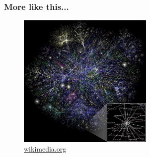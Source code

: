     \begin{frame}
    \frametitle{More like this...}
      \begin{figure}
    \includegraphics[height=6.5cm]{./imgs/map.jpg}
  \caption{\color{blue}\href{https://upload.wikimedia.org/wikipedia/commons/thumb/d/d2/Internet_map_1024.jpg/768px-Internet_map_1024.jpg}{wikimedia.org}}
  \label{fig:routing}
      \end{figure}
  \end{frame}


